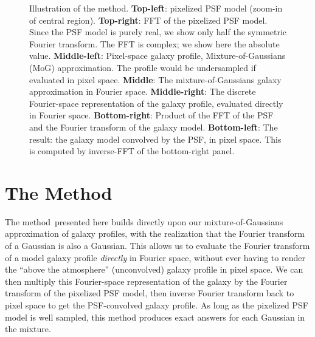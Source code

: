 \documentclass[11pt,preprint]{aastex}
\newcommand{\trick}{method}
\newcommand{\Trick}{Method}
\begin{document}
\begin{figure}
{    Illustration of the \trick.
    \textbf{Top-left}: pixelized PSF model (zoom-in of central region).
    \textbf{Top-right}: 
    FFT of the pixelized PSF model.  Since the PSF model is
    purely real, we show only half the symmetric Fourier transform. The FFT is
    complex; we show here the absolute value.
    \textbf{Middle-left}: Pixel-space galaxy profile,
    Mixture-of-Gaussians (MoG) approximation.  The profile would be
    undersampled if evaluated in pixel space.
    \textbf{Middle}: The mixture-of-Gaussians galaxy approximation in
    Fourier space.
    \textbf{Middle-right}: The discrete Fourier-space representation of the
    galaxy profile, evaluated directly in Fourier space.
    \textbf{Bottom-right}: Product of the FFT of the PSF and the
    Fourier transform of the galaxy model.
    \textbf{Bottom-left}: The result: the galaxy model convolved by the
    PSF, in pixel space.  This is computed by inverse-FFT of the
    bottom-right panel.
  }
\end{figure}





\section{The \Trick}

The \trick\ presented here builds directly upon our mixture-of-Gaussians
approximation of galaxy profiles, with the realization that the
Fourier transform of a Gaussian is also a Gaussian.  This allows us to
evaluate the Fourier transform of a model galaxy profile \emph{directly} in Fourier
space, without ever having to render the ``above the atmosphere''
(unconvolved) galaxy profile in pixel space.
We can then multiply this Fourier-space
representation of the galaxy by the Fourier transform of the pixelized
PSF model, then inverse Fourier transform back to pixel space to get
the PSF-convolved galaxy profile.
%
As long as the pixelized PSF model is well sampled, this method produces
exact answers for each Gaussian in the mixture.
\end{document}
